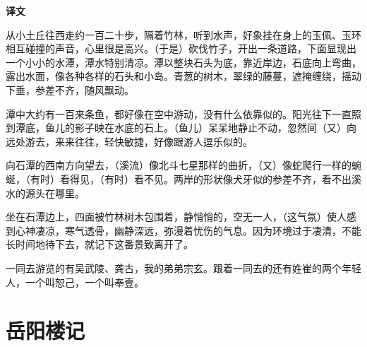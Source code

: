 \documentclass[12pt,UTF-8,openany,a4]{ctexbook}
\begin{document}
\newpage

\begin{Large}
    \noindent\textbf{译文}
\end{Large}


\vspace{1em}

\begin{large}
    \yiwen 
    从小土丘往西走约一百二十步，隔着竹林，听到水声，好象挂在身上的玉佩、玉环相互碰撞的声音，心里很是高兴。（于是）砍伐竹子，开出一条道路，下面显现出一个小小的水潭，潭水特别清凉。潭以整块石头为底，靠近岸边，石底向上弯曲，露出水面，像各种各样的石头和小岛。青葱的树木，翠绿的藤蔓，遮掩缠绕，摇动下垂，参差不齐，随风飘动。
    
    潭中大约有一百来条鱼，都好像在空中游动，没有什么依靠似的。阳光往下一直照到潭底，鱼儿的影子映在水底的石上。（鱼儿）呆呆地静止不动，忽然间（又）向远处游去，来来往往，轻快敏捷，好像跟游人逗乐似的。
    
    向石潭的西南方向望去，（溪流）像北斗七星那样的曲折，（又）像蛇爬行一样的蜿蜒，（有时）看得见，（有时）看不见。两岸的形状像犬牙似的参差不齐，看不出溪水的源头在哪里。
    
    坐在石潭边上，四面被竹林树木包围着，静悄悄的，空无一人，（这气氛）使人感到心神凄凉，寒气透骨，幽静深远，弥漫着忧伤的气息。因为环境过于凄清，不能长时间地待下去，就记下这番景致离开了。
    
    一同去游览的有吴武陵、龚古，我的弟弟宗玄。跟着一同去的还有姓崔的两个年轻人，一个叫恕己，一个叫奉壹。
    
\end{large}



\chapter{岳阳楼记}
\end{document}
